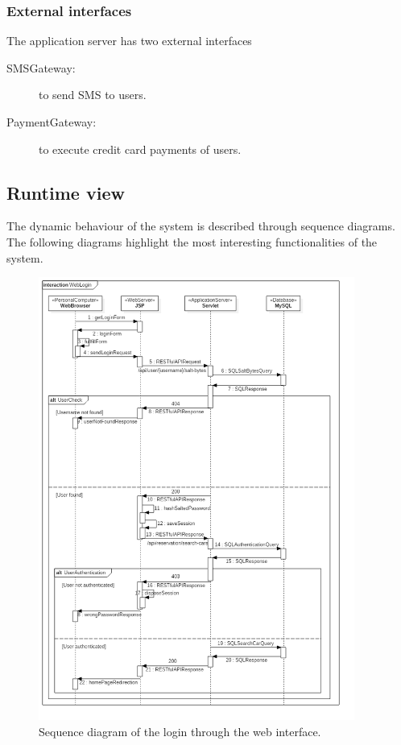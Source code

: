 \subsubsection{External interfaces}

The application server has two external interfaces
\begin{description}
	\item[SMSGateway:] to send SMS to users.
	\item[PaymentGateway:] to execute credit card payments of users.
\end{description}

\subsection{Runtime view}

The dynamic behaviour of the system is described through sequence diagrams. The following diagrams highlight the most interesting functionalities of the system.

\begin{figure}[H]
	\noindent
    	\centering
    	\includegraphics[height=550px, keepaspectratio]{diagrams/SequenceLogin.png}
	\caption{Sequence diagram of the login through the web interface.}
    	\label{fig:sequence-login}
\end{figure}


